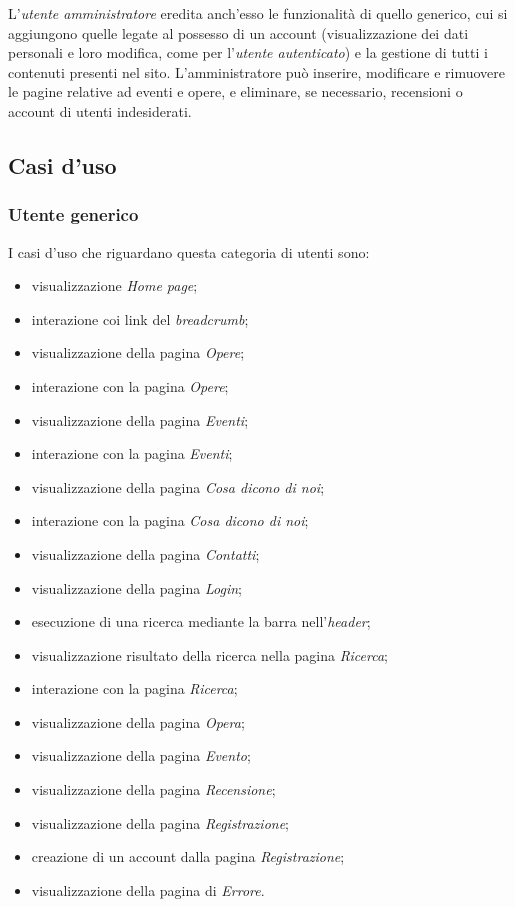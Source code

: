 L'\textit{utente amministratore} eredita anch'esso le funzionalità di quello generico, cui si aggiungono quelle legate al possesso di un account (visualizzazione dei dati personali e loro modifica, come per l'\textit{utente autenticato}) e  la gestione di tutti i contenuti presenti nel sito. L'amministratore può inserire, modificare e rimuovere le pagine relative ad eventi e opere, e eliminare, se necessario, recensioni o account di utenti indesiderati.


\subsection{Casi d'uso}
\label{analisi-casi-uso}

\subsubsection{Utente generico}
\label{analisi-casi-uso-attori-principali-utente-generico}
I casi d'uso che riguardano questa categoria di utenti sono:
\begin{itemize}
	\item visualizzazione \textit{Home page};
	\item interazione coi link del \textit{breadcrumb};
	\item visualizzazione della pagina \textit{Opere};
	\item interazione con la pagina \textit{Opere};
	\item visualizzazione della pagina \textit{Eventi};
	\item interazione con la pagina \textit{Eventi};
	\item visualizzazione della pagina \textit{Cosa dicono di noi};
	\item interazione con la pagina \textit{Cosa dicono di noi};
	\item visualizzazione della pagina \textit{Contatti};
	\item visualizzazione della pagina \textit{Login};
	\item esecuzione di una ricerca mediante la barra nell'\textit{header};
	\item visualizzazione risultato della ricerca nella pagina \textit{Ricerca};
	\item interazione con la pagina \textit{Ricerca};
	\item visualizzazione della pagina \textit{Opera};
	\item visualizzazione della pagina \textit{Evento};
	\item visualizzazione della pagina \textit{Recensione};
	\item visualizzazione della pagina \textit{Registrazione};
	\item creazione di un account dalla pagina \textit{Registrazione};
	\item visualizzazione della pagina di \textit{Errore}.
\end{itemize}

